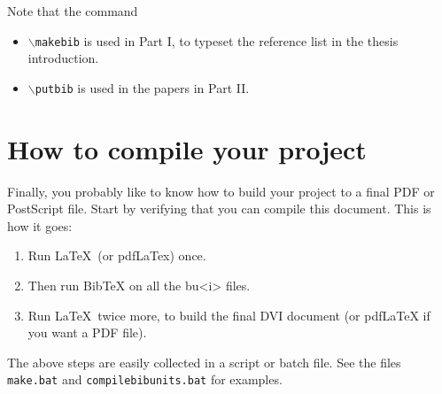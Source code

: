 Note that the command
\begin{itemize}
	\item \texttt{$\backslash$makebib} is used in Part I, to typeset the reference list in the thesis introduction.
	\item \texttt{$\backslash$putbib} is used in the papers in Part II.
\end{itemize}

\section{How to compile your project}
Finally, you probably like to know how to build your project to a
final PDF or PostScript file. Start by verifying that you can
compile this document. This is how it goes:
%
\begin{enumerate}
    \item Run \LaTeX\ (or pdfLaTex) once.
    \item Then run BibTeX on all the
    bu<i> files.
    \item Run \LaTeX\ twice more, to build the final DVI document
    (or pdfLaTeX if you want a PDF file).
\end{enumerate}

The above steps are easily collected in a script or batch file. See
the files \texttt{make.bat} and \texttt{compilebibunits.bat} for
examples.


